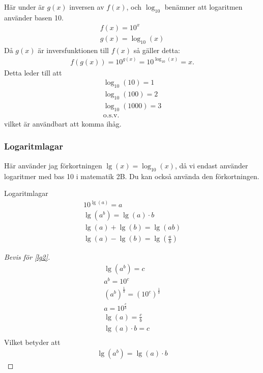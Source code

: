 Här under är $g(x)$ inversen av $f(x)$, och $\log_{10}$ benämner att logaritmen använder basen 10.
\begin{align}
	f(x) = 10^x \\
	g(x) = \log_{10}(x)
\end{align}
Då $g(x)$ är inversfunktionen till $f(x)$ så gäller detta:
\begin{align}
	f(g(x)) = 10^{g(x)} = 10^{\log_{10}(x)} = x.
\end{align}
Detta leder till att
\begin{align}
	\log_{10}(10) = 1 \\
	\log_{10}(100) = 2 \\
	\log_{10}(1000) = 3 \\
	\text{o.s.v.}
\end{align}
vilket är användbart att komma ihåg.

\newpage
\subsubsection{Logaritmlagar}

Här använder jag förkortningen $\lg(x) = \log_{10}(x)$, då vi endast använder logaritmer med bas 10 i matematik 2B. Du kan också använda den förkortningen.

\begin{theorem}{Logaritmlagar}
	\begin{align}
	10^{\lg(a)}=a \\
	\lg(a^b) = \lg(a)\cdot b \label{lg2} \\
	\lg(a)+\lg(b) = \lg(ab) \label{lg3} \\
	\lg(a)-\lg(b) = \lg\left(\frac{a}{b}\right) \label{lg4}
\end{align} 
\end{theorem}	

\begin{proof}[Bevis för \eqref{lg2}]
	\begin{align}
		\lg(a^b) = c \\ 
		a^b = 10^c \\
		(a^b)^{\frac{1}{b}} = (10^c)^{\frac{1}{b}} \\
		a = 10^{\frac{c}{b}} \\
		\lg(a) = \frac{c}{b} \\
		\lg(a)\cdot b = c \\
	\end{align}
	Vilket betyder att
	\begin{align}
		\lg(a^b) = \lg(a)\cdot b
	\end{align}
\end{proof}

